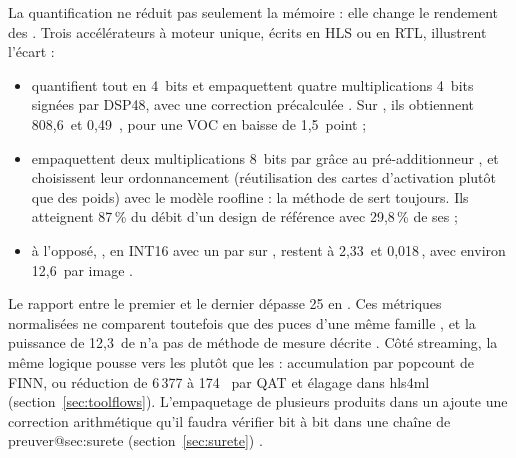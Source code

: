 La quantification ne réduit pas seulement la mémoire : elle change le rendement des .
Trois accélérateurs  à moteur unique, écrits en HLS ou en RTL, illustrent l'écart :
\begin{itemize}
  \item \citet{2024-yan-fpga-yolov5-accelerator-real-time} quantifient tout  en
    4~bits et empaquettent quatre multiplications 4~bits signées par DSP48, avec une
    correction précalculée . Sur , ils obtiennent 808,6\, et
    0,49\, , pour une  VOC en baisse de 1,5~point
     ;
  \item \citet{2024-zhang-end-end-acceleration-yolo-object} empaquettent deux
    multiplications 8~bits par  grâce au pré-additionneur , et choisissent
    leur ordonnancement (réutilisation des cartes d'activation plutôt que des poids) avec le
    modèle roofline  : la méthode de
    \citet{2015-zhang-optimizing-fpga-accelerator-design-deep} sert toujours. Ils
    atteignent 87\,\% du débit d'un design de référence avec 29,8\,\% de ses 
     ;
  \item à l'opposé, \citet{2025-kim-design-implementation-yolov2-accelerator-zynq}, en
    INT16 avec un  par  sur , restent à 2,33\, et 0,018\,, avec
    environ 12,6\, par image .
\end{itemize}
Le rapport entre le premier et le dernier dépasse 25 en  \deduit. Ces métriques
normalisées ne comparent toutefois que des puces d'une même famille
\citep[§3.1]{2018-venieris-toolflows-mapping-convolutional-neural-networks}, et la
puissance de 12,3\, de \citet{2024-yan-fpga-yolov5-accelerator-real-time} n'a pas de méthode
de mesure décrite . Côté streaming, la même logique pousse vers les  plutôt que
les  : accumulation par popcount de FINN, ou réduction de 6\,377 à 174~ par QAT et
élagage dans hls4ml (section~\ref{sec:toolflows}). L'empaquetage de plusieurs produits dans
un  ajoute une correction arithmétique qu'il faudra vérifier bit à bit dans une chaîne de
preuve\ifcsname r@sec:surete\endcsname{} (section~\ref{sec:surete})\fi{} \deduit.
